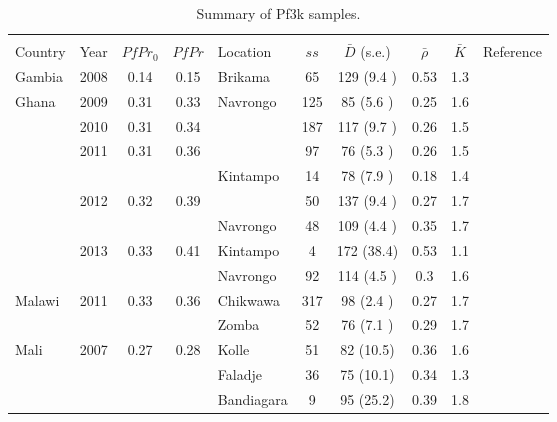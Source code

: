 \documentclass[9pt,lineno]{elife}
\begin{document}
\begin{table}[btp]
  \caption{Summary of Pf3k samples.}\label{tab:Pf3k}
{\small
\begin{tabular}{p{1.4cm} c c c |p{1.7cm} c c c c p{2.7cm}}
\toprule
                &          &          &      &         &        &                   &              &          &  \\
Country         &   Year   &$PfPr_{0}$&$PfPr$&Location & $ss$   & $\bar{D}$ (s.e.)  & $\bar{\rho}$ & $\bar{K}$& Reference\\
\midrule
Gambia          &2008           &0.14  &0.15  &Brikama&65   &129  (9.4 )&0.53 &1.3  & \citet{Amambua-Ngwa2012}\\
\hline
Ghana           &2009           &0.31  &0.33  &Navrongo&125  &85   (5.6 )&0.25 &1.6  &\multirow{3}{*}{\parbox{3.4cm}{\citet{Duffy2015,Kamau2015,eLife2016}}}\\
                &2010           &0.31  &0.34  &               &187  &117  (9.7 )&0.26 &1.5  &\\
                &2011           &0.31  &0.36  &               &97   &76   (5.3 )&0.26 &1.5  &\\
                &               &               &               &Kintampo&14   &78   (7.9 )&0.18 &1.4  &\\
                &2012           &0.32  &0.39  &               &50   &137  (9.4 )&0.27 &1.7  &\\
                &               &               &               &Navrongo&48   &109  (4.4 )&0.35 &1.7  &\\
                &2013           &0.33  &0.41  &Kintampo&4    &172  (38.4)&0.53 &1.1  &\\
                &               &               &               &Navrongo&92   &114  (4.5 )&0.3  &1.6  &\\
\hline
Malawi          &2011           &0.33  &0.36  &Chikwawa&317  &98   (2.4 )&0.27 &1.7  &\citet{Ocholla2014}\\
                &               &               &               &Zomba&52   &76   (7.1 )&0.29 &1.7  &\\
\hline
Mali            &2007           &0.27  &0.28  &Kolle&51   &82   (10.5)&0.36 &1.6  &\multirow{3}{*}{\parbox{3.4cm}{\citet{eLife2016}}}\\
                &               &               &               &Faladje&36   &75   (10.1)&0.34 &1.3  &\\
                &               &               &               &Bandiagara&9    &95   (25.2)&0.39 &1.8  &\\

\end{tabular}}
\end{table}
\end{document}

